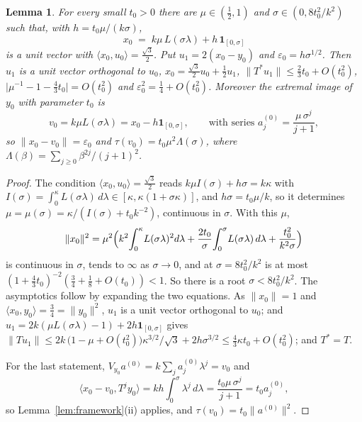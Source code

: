 \documentclass[11pt]{article}
\newtheorem{lemma}[theorem]{Lemma}
\theoremstyle{definition}
\newcommand{\ip}[2]{\langle #1,#2\rangle}
\newcommand{\norm}[1]{\lVert #1\rVert}
\newcommand{\abs}[1]{\lvert #1\rvert}
\newcommand{\one}{\mathbf 1}
\begin{document}
\begin{lemma}\label{lem:x0}
For every small $t_0>0$ there are $\mu\in(\frac12,1)$ and $\sigma\in(0,8t_0^2/k^2)$ such that,
with $h=t_0\mu/(k\sigma)$,
\[
x_0\;=\;k\mu\,L(\sigma\lambda)+h\,\one_{[0,\sigma]}
\]
is a unit vector with $\ip{x_0}{u_0}=\frac{\sqrt3}2$. Put $u_1=2(x_0-y_0)$ and
$\varepsilon_0=h\sigma^{1/2}$. Then $u_1$ is a unit vector orthogonal to $u_0$,
$x_0=\frac{\sqrt3}2u_0+\frac12u_1$, $\norm{T^*u_1}\le\frac23t_0+O(t_0^2)$,
$\abs{\mu^{-1}-1-\frac43t_0}=O(t_0^2)$ and $\varepsilon_0^2=\frac14+O(t_0^2)$. Moreover the
extremal image of $y_0$ with parameter $t_0$ is
\[
v_0=k\mu L(\sigma\lambda)=x_0-h\one_{[0,\sigma]},\qquad\text{with series }
a^{(0)}_j=\frac{\mu\,\sigma^j}{j+1},
\]
so $\norm{x_0-v_0}=\varepsilon_0$ and
$\tau(v_0)=t_0\mu^2\Lambda(\sigma)$, where $\Lambda(\beta)=\sum_{j\ge0}\beta^{2j}/(j+1)^2$.
\end{lemma}
\begin{proof}
The condition $\ip{x_0}{u_0}=\frac{\sqrt3}2$ reads $k\mu I(\sigma)+h\sigma=k\kappa$ with
$I(\sigma)=\int_0^\kappa L(\sigma\lambda)\,d\lambda\in[\kappa,\kappa(1+\sigma\kappa)]$, and
$h\sigma=t_0\mu/k$, so it determines $\mu=\mu(\sigma)=\kappa/(I(\sigma)+t_0k^{-2})$,
continuous in $\sigma$. With this $\mu$,
\[
\norm{x_0}^2=\mu^2\Bigl(k^2\!\int_0^\kappa\!L(\sigma\lambda)^2d\lambda
+\frac{2t_0}\sigma\!\int_0^\sigma\!L(\sigma\lambda)\,d\lambda+\frac{t_0^2}{k^2\sigma}\Bigr)
\]
is continuous in $\sigma$, tends to $\infty$ as $\sigma\to0$, and at $\sigma=8t_0^2/k^2$ is at
most $(1+\frac43t_0)^{-2}(\frac34+\frac18+O(t_0))<1$. So there is a root
$\sigma<8t_0^2/k^2$. The asymptotics follow by expanding the two equations. As
$\norm{x_0}=1$ and $\ip{x_0}{y_0}=\frac34=\norm{y_0}^2$, $u_1$ is a unit vector orthogonal to
$u_0$; and $u_1=2k(\mu L(\sigma\lambda)-1)+2h\one_{[0,\sigma]}$ gives
$\norm{Tu_1}\le2k\,\bigl(1-\mu+O(t_0^2)\bigr)\kappa^{3/2}/\sqrt3+2h\sigma^{3/2}
\le\frac43\kappa t_0+O(t_0^2)$; and $T^*=T$.

For the last statement, $V_{y_0}a^{(0)}=k\sum_ja^{(0)}_j\lambda^j=v_0$ and
\[
\ip{x_0-v_0}{T^jy_0}=kh\!\int_0^\sigma\!\lambda^j\,d\lambda=\frac{t_0\mu\,\sigma^{j}}{j+1}
=t_0a^{(0)}_j ,
\]
so Lemma~\ref{lem:framework}(ii) applies, and $\tau(v_0)=t_0\norm{a^{(0)}}^2$.
\end{proof}
\end{document}
